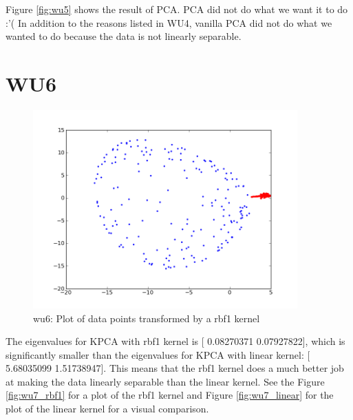 Figure \ref{fig:wu5} shows the result of PCA. 
PCA did not do what we want it to do :'(
In addition to the reasons listed in WU4, vanilla PCA 
did not do what we wanted to do because the data 
is not linearly separable.

\section*{WU6}
\begin{figure}[here]
	\center
	\caption{wu6: Plot of data points transformed by a rbf1 kernel}
	\label{fig:wu6}
	\includegraphics[width=4.0in]{img/wu7_rbf1.png}
\end{figure}

The eigenvalues for KPCA with rbf1 kernel is [ 0.08270371  0.07927822], which is significantly smaller than
the eigenvalues for KPCA with linear kernel: [ 5.68035099  1.51738947]. This means that the rbf1 kernel does a much 
better job at making the data linearly separable than the linear kernel. See the Figure \ref{fig:wu7_rbf1} for a plot of the rbf1 kernel and Figure \ref{fig:wu7_linear} for the plot of the linear kernel for a visual comparison.

